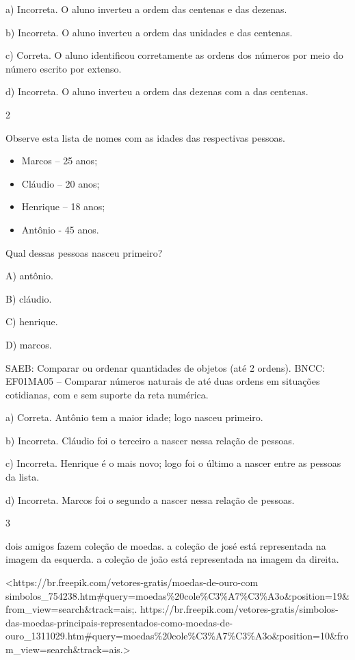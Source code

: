 a) Incorreta. O aluno inverteu a ordem das centenas e das dezenas.

b) Incorreta. O aluno inverteu a ordem das unidades e das centenas.

c) Correta. O aluno identificou corretamente as ordens dos números
por meio do número escrito por extenso.

d) Incorreta. O aluno inverteu a ordem das dezenas com a das centenas.

\num{2}

Observe esta lista de nomes com as idades das respectivas pessoas.

\begin{itemize}
  \item Marcos -- 25 anos;
  \item Cláudio -- 20 anos;
  \item Henrique -- 18 anos;
  \item Antônio - 45 anos.
\end{itemize}

Qual dessas pessoas nasceu primeiro?

A) antônio.

B) cláudio.

C) henrique.

D) marcos.

SAEB: Comparar ou ordenar quantidades de objetos (até 2
ordens).
BNCC: EF01MA05 -- Comparar números naturais de até duas ordens em
situações cotidianas, com e sem suporte da reta numérica.

a) Correta. Antônio tem a maior idade; logo nasceu primeiro.

b) Incorreta. Cláudio foi o terceiro a nascer nessa relação de pessoas.

c) Incorreta. Henrique é o mais novo; logo foi o último a nascer entre as pessoas da lista.

d) Incorreta. Marcos foi o segundo a nascer nessa relação de pessoas.

\num{3}

dois amigos fazem coleção de moedas. a coleção de josé está representada na imagem da
esquerda. a coleção de joão está representada na imagem da direita.

\textless{}https://br.freepik.com/vetores-gratis/moedas-de-ouro-com
simbolos\_754238.htm\#query=moedas\%20cole\%C3\%A7\%C3\%A3o\&position=19\&from\_view=search\&track=ais;.
https://br.freepik.com/vetores-gratis/simbolos-das-moedas-principais-representados-como-moedas-de-ouro\_1311029.htm\#query=moedas\%20cole\%C3\%A7\%C3\%A3o\&position=10\&from\_view=search\&track=ais.\textgreater{}

